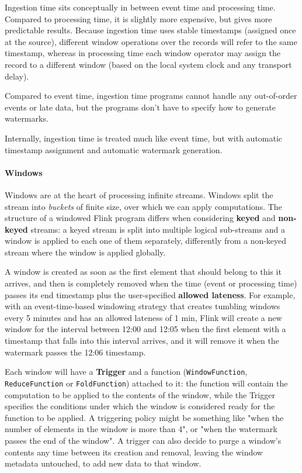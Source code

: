 \begin{itemize}
    Ingestion time sits conceptually in between event time and processing time. Compared to processing time, it is slightly more expensive, but gives more predictable results. Because ingestion time uses stable timestamps (assigned once at the source), different window operations over the records will refer to the same timestamp, whereas in processing time each window operator may assign the record to a different window (based on the local system clock and any transport delay).
    
    Compared to event time, ingestion time programs cannot handle any out-of-order events or late data, but the programs don’t have to specify how to generate watermarks.
    
    Internally, ingestion time is treated much like event time, but with automatic timestamp assignment and automatic watermark generation.
\end{itemize}


\paragraph{Windows}

Windows are at the heart of processing infinite streams. Windows split the stream into \textit{buckets} of finite size, over which we can apply computations. The structure of a windowed Flink program differs when considering \textbf{keyed} and \textbf{non-keyed} streams: a keyed stream is split into multiple logical sub-streams and a window is applied to each one of them separately, differently from a non-keyed stream where the window is applied globally.

A window is created as soon as the first element that should belong to this it arrives, and then is completely removed when the time (event or processing time) passes its end timestamp plus the user-specified \textbf{allowed lateness}. For example, with an event-time-based windowing strategy that creates tumbling windows every 5 minutes and has an allowed lateness of 1 min, Flink will create a new window for the interval between 12:00 and 12:05 when the first element with a timestamp that falls into this interval arrives, and it will remove it when the watermark passes the 12:06 timestamp.

Each window will have a \textbf{Trigger} and a function (\texttt{WindowFunction}, \texttt{ReduceFunction} or \texttt{FoldFunction}) attached to it: the function will contain the computation to be applied to the contents of the window, while the Trigger specifies the conditions under which the window is considered ready for the function to be applied. A triggering policy might be something like "when the number of elements in the window is more than 4", or "when the watermark passes the end of the window". A trigger can also decide to purge a window’s contents any time between its creation and removal, leaving the window metadata untouched, to add new data to that window.

